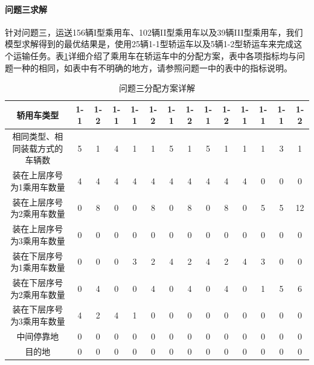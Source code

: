 \documentclass[UTF8]{ctexart}
\begin{document}
\paragraph{问题三求解}
针对问题三，运送156辆I型乘用车、102辆II型乘用车以及39辆III型乘用车，我们模型求解得到的最优结果是，使用25辆1-1型轿运车以及5辆1-2型轿运车来完成这个运输任务。表\ref{tab:answer3}详细介绍了乘用车在轿运车中的分配方案，表中各项指标均与问题一种的相同，如表中有不明确的地方，请参照问题一中的表中的指标说明。
\begin{table}[h!]
\centering
\caption{问题三分配方案详解}\label{tab:answer3}
\begin{tabular}{|c|c|c|c|c|c|c|c|c|c|c|c|c|c|}
\hline
轿用车类型 & 1-1 & 1-2 & 1-1 & 1-1 & 1-2 & 1-1 & 1-2 & 1-1 & 1-2 & 1-1 & 1-1 & 1-1 & 1-2\\ \hline 
相同类型、相同装载方式的车辆数 & 5 & 1 & 4 & 1 & 1 & 5 & 1 & 5 & 1 & 1 & 1 & 3 & 1\\ \hline 
装在上层序号为1乘用车数量 & 4 & 4 & 4 & 4 & 4 & 4 & 4 & 4 & 4 & 4 & 0 & 0 & 0\\ \hline 
装在上层序号为2乘用车数量 & 0 & 8 & 0 & 0 & 8 & 0 & 8 & 0 & 8 & 0 & 5 & 5 & 12\\ \hline 
装在上层序号为3乘用车数量 & 0 & 0 & 0 & 0 & 0 & 0 & 0 & 0 & 0 & 0 & 0 & 0 & 0\\ \hline 
装在下层序号为1乘用车数量 & 0 & 0 & 0 & 3 & 2 & 4 & 2 & 4 & 2 & 4 & 3 & 0 & 0\\ \hline 
装在下层序号为2乘用车数量 & 0 & 4 & 0 & 0 & 4 & 0 & 4 & 0 & 4 & 0 & 1 & 5 & 6\\ \hline 
装在下层序号为3乘用车数量 & 4 & 2 & 4 & 1 & 0 & 0 & 0 & 0 & 0 & 0 & 0 & 0 & 0\\ \hline 
中间停靠地 & 0 & 0 & 0 & 0 & 0 & 0 & 0 & 0 & 0 & 0 & 0 & 0 & 0\\ \hline 
目的地 & 0 & 0 & 0 & 0 & 0 & 0 & 0 & 0 & 0 & 0 & 0 & 0 & 0\\ \hline 
\end{tabular}
\end{table}
\end{document}
